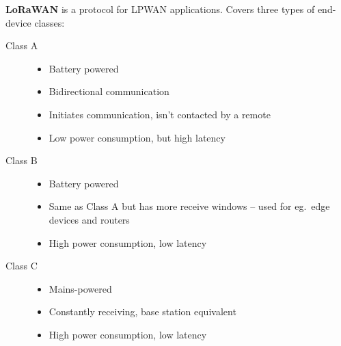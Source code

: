 \documentclass[a4paper, 11pt]{article}
\begin{document}
{    \textbf{LoRaWAN} is a protocol for LPWAN applications. Covers three types of end-device classes:
    \begin{description}
    \item[Class A]
    {\hfill
        \begin{itemize}
        \item Battery powered
        \item Bidirectional communication
        \item Initiates communication, isn't contacted by a remote
        \item Low power consumption, but high latency
        \end{itemize}
    }
    \item[Class B]
    {\hfill
        \begin{itemize}
        \item Battery powered
        \item Same as Class A but has more receive windows -- used for eg.\ edge devices and routers
        \item High power consumption, low latency
        \end{itemize}
    }
    \item[Class C]
    {\hfill
        \begin{itemize}
        \item Mains-powered
        \item Constantly receiving, base station equivalent
        \item High power consumption, low latency
        \end{itemize}
    }
    \end{description}
}
\end{document}

